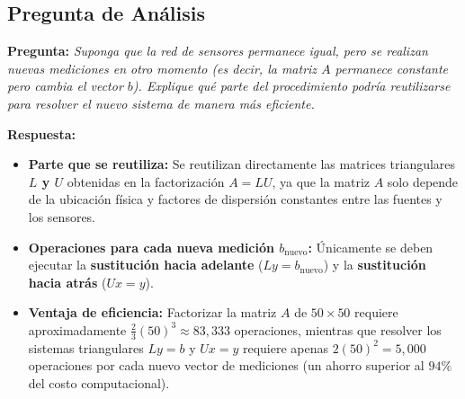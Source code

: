 \documentclass[11pt,a4paper]{article}
\begin{document}
\subsection{Pregunta de Análisis}
\textbf{Pregunta:} \textit{Suponga que la red de sensores permanece igual, pero se realizan nuevas mediciones en otro momento (es decir, la matriz $A$ permanece constante pero cambia el vector $b$). Explique qué parte del procedimiento podría reutilizarse para resolver el nuevo sistema de manera más eficiente.}

\medskip
\noindent\textbf{Respuesta:}
\begin{itemize}[leftmargin=*]
    \item \textbf{Parte que se reutiliza:} Se reutilizan directamente las matrices triangulares \textbf{$L$ y $U$} obtenidas en la factorización $A = LU$, ya que la matriz $A$ solo depende de la ubicación física y factores de dispersión constantes entre las fuentes y los sensores.
    \item \textbf{Operaciones para cada nueva medición $b_{\text{nuevo}}$:} Únicamente se deben ejecutar la \textbf{sustitución hacia adelante} ($Ly = b_{\text{nuevo}}$) y la \textbf{sustitución hacia atrás} ($Ux = y$).
    \item \textbf{Ventaja de eficiencia:} Factorizar la matriz $A$ de $50 \times 50$ requiere aproximadamente $\frac{2}{3}(50)^3 \approx 83,333$ operaciones, mientras que resolver los sistemas triangulares $Ly = b$ y $Ux = y$ requiere apenas $2(50)^2 = 5,000$ operaciones por cada nuevo vector de mediciones (un ahorro superior al $94\%$ del costo computacional).
\end{itemize}
\end{document}
